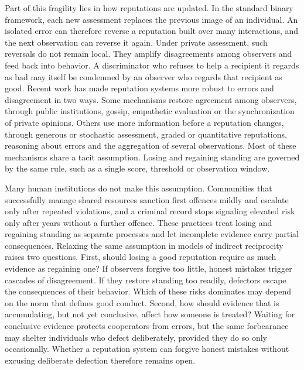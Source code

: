 \documentclass[fleqn,10pt]{wlscirep}
\theoremstyle{plain}
\begin{document}
Part of this fragility lies in how reputations are updated. In the standard binary framework, each new assessment replaces the previous image of an individual\cite{ohtsuki2004,hilbe2018}. An isolated error can therefore reverse a reputation built over many interactions, and the next observation can reverse it again. Under private assessment, such reversals do not remain local. They amplify disagreements among observers and feed back into behavior. A discriminator who refuses to help a recipient it regards as bad may itself be condemned by an observer who regards that recipient as good\cite{hilbe2018,radzvilavicius2019,okada2020}. Recent work has made reputation systems more robust to errors and disagreement in two ways. Some mechanisms restore agreement among observers, through public institutions\cite{radzvilavicius2021}, gossip\cite{kawakatsu2024}, empathetic evaluation\cite{radzvilavicius2019} or the synchronization of private opinions\cite{murase2024synchronization,tham2026,okada2024}. Others use more information before a reputation changes, through generous or stochastic assessment\cite{schmid2021,murase2023}, graded or quantitative reputations\cite{tanabe2013,murase2022,schmid2023,clark2020}, reasoning about errors\cite{pandula2024,morsky2024} and the aggregation of several observations\cite{michelmata2024}. Most of these mechanisms share a tacit assumption. Losing and regaining standing are governed by the same rule, such as a single score, threshold or observation window\cite{schmid2023,michelmata2024,yamamoto2025}.

Many human institutions do not make this assumption. Communities that successfully manage shared resources sanction first offences mildly and escalate only after repeated violations\cite{ostrom1990,cox2010}, and a criminal record stops signaling elevated risk only after years without a further offence\cite{blumstein2009}. These practices treat losing and regaining standing as separate processes and let incomplete evidence carry partial consequences. Relaxing the same assumption in models of indirect reciprocity raises two questions. First, should losing a good reputation require as much evidence as regaining one? If observers forgive too little, honest mistakes trigger cascades of disagreement. If they restore standing too readily, defectors escape the consequences of their behavior. Which of these risks dominates may depend on the norm that defines good conduct. Second, how should evidence that is accumulating, but not yet conclusive, affect how someone is treated? Waiting for conclusive evidence protects cooperators from errors, but the same forbearance may shelter individuals who defect deliberately, provided they do so only occasionally\cite{schmid2021,michelmata2024}. Whether a reputation system can forgive honest mistakes without excusing deliberate defection therefore remains open.
\end{document}
